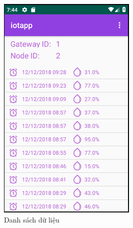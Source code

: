 \documentclass[a4paper]{article}
\begin{document}
\begin{enumerate}
	\begin{figure}[htp]
		  \centering
 		 \begin{minipage}[b]{0.3\textwidth}
   			 \includegraphics[width=\textwidth]{listviewHome.png}
   			 \caption{Danh sách dữ liệu}
			\label{fig:listviewHomeApp}
  		\end{minipage}
 		 \hfill
 		 \begin{minipage}[b]{0.3\textwidth}

\end{minipage}
\end{figure}
\end{enumerate}
\end{document}
